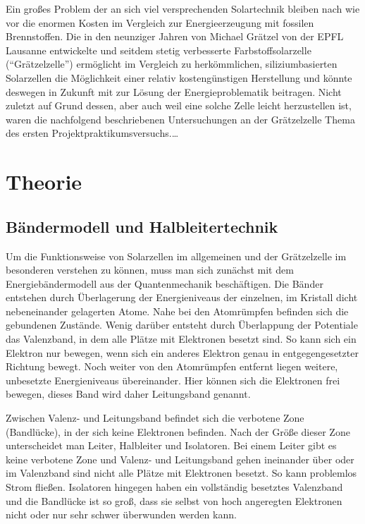 \documentclass[11pt]{scrartcl}
\begin{document}
Ein großes Problem der an sich viel versprechenden Solartechnik bleiben nach wie vor die enormen Kosten im Vergleich zur Energieerzeugung mit fossilen Brennstoffen. Die in den neunziger Jahren von Michael Grätzel von der EPFL Lausanne entwickelte und seitdem stetig verbesserte Farbstoffsolarzelle ("`Grätzelzelle"') ermöglicht im Vergleich zu herkömmlichen, siliziumbasierten Solarzellen die Möglichkeit einer relativ kostengünstigen Herstellung und könnte deswegen in Zukunft mit zur Lösung der Energieproblematik beitragen. Nicht zuletzt auf Grund dessen, aber auch weil eine solche Zelle leicht herzustellen ist, waren die nachfolgend beschriebenen Untersuchungen an der Grätzelzelle Thema des ersten Projektpraktikumsversuchs.\ldots





\section{Theorie}
\subsection{B\"andermodell und Halbleitertechnik}
Um die Funktionsweise von Solarzellen im allgemeinen und der Gr\"atzelzelle im besonderen verstehen zu k\"onnen, muss man sich zun\"achst mit dem Energieb\"andermodell aus der Quantenmechanik besch\"aftigen. Die B\"ander entstehen durch \"Uberlagerung der Energieniveaus der einzelnen, im Kristall dicht nebeneinander gelagerten Atome. Nahe bei den Atomr\"umpfen befinden sich die gebundenen Zust\"ande. Wenig dar\"uber entsteht durch \"Uberlappung der Potentiale das Valenzband, in dem alle Pl\"atze mit Elektronen besetzt sind. So kann sich ein Elektron nur bewegen, wenn sich ein anderes Elektron genau in entgegengesetzter Richtung bewegt. 
Noch weiter von den Atomr\"umpfen entfernt liegen weitere, unbesetzte Energieniveaus \"ubereinander. Hier k\"onnen sich die Elektronen frei bewegen, dieses Band wird daher Leitungsband genannt.

Zwischen Valenz- und Leitungsband befindet sich die verbotene Zone (Bandl\"ucke), in der sich keine Elektronen befinden. Nach der Gr\"o\ss{}e dieser Zone unterscheidet man Leiter, Halbleiter und Isolatoren. Bei einem Leiter gibt es keine verbotene Zone und Valenz- und Leitungsband gehen ineinander \"uber oder im Valenzband sind nicht alle Pl\"atze mit Elektronen besetzt. So kann problemlos Strom fließen. Isolatoren hingegen haben ein vollst\"andig besetztes Valenzband und die Bandl\"ucke ist so gro\ss{}, dass sie selbst von hoch angeregten Elektronen nicht oder nur sehr schwer \"uberwunden werden kann.
\end{document}
